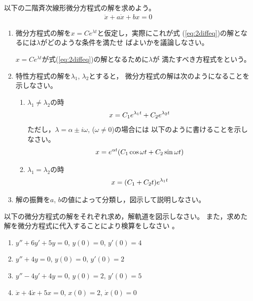 \documentclass[twocolumn,11pt]{jarticle}
\begin{document}
以下の二階斉次線形微分方程式の解を求めよう。
\begin{align}
  \label{eq:2diffeq}
  \ddot{x}+a\dot{x}+bx=0
\end{align}
\begin{enumerate}
\item 微分方程式の解を$x=Ce^{\lambda t}$と仮定し，実際にこれが式
  (\ref{eq:2diffeq})の解となるには$\lambda$がどのような条件を満たせ
  ばよいかを議論しなさい。

  \comment
  $x=Ce^{\lambda t}$が式(\ref{eq:2diffeq})の解となるために$\lambda$が
  満たすべき方程式をという。
\item 特性方程式の解を$\lambda_1$, $\lambda_2$とすると，
  微分方程式の解は次のようになることを示しなさい。
  \begin{enumerate}
  \item $\lambda_1\ne\lambda_2$の時
    \begin{align}
      x=C_1e^{\lambda_1t}+C_2e^{\lambda_2t}\notag
    \end{align}
    ただし，$\lambda=\alpha\pm i\omega$, ($\omega\ne 0$)の場合には
    以下のように書けることを示しなさい。
    \begin{align}
      x=e^{\alpha t}(C_1\cos{\omega t}+C_2\sin{\omega t})\notag
    \end{align}
  \item $\lambda_1=\lambda_2$の時
    \begin{align}
      x=(C_1+C_2t)e^{\lambda_1t}\notag
    \end{align}
  \end{enumerate}
\item 解の振舞を$a$, $b$の値によって分類し，図示して説明しなさい。
\end{enumerate}

\exercise
以下の微分方程式の解をそれぞれ求め，解軌道を図示しなさい。
また，求めた解を微分方程式に代入することにより検算をしなさい
。
\begin{enumerate}
\item $y''+6y'+5y=0$, $y(0)=0$, $y'(0)=4$
\item $y''+4y=0$, $y(0)=0$, $y'(0)=2$
\item $y''-4y'+4y=0$, \;$y(0)=2$, \;$y'(0)=5$
\item $\ddot{x}+4\dot{x}+5x=0$, $x(0)=2$, $\dot{x}(0)=0$
\end{enumerate}
\end{document}
